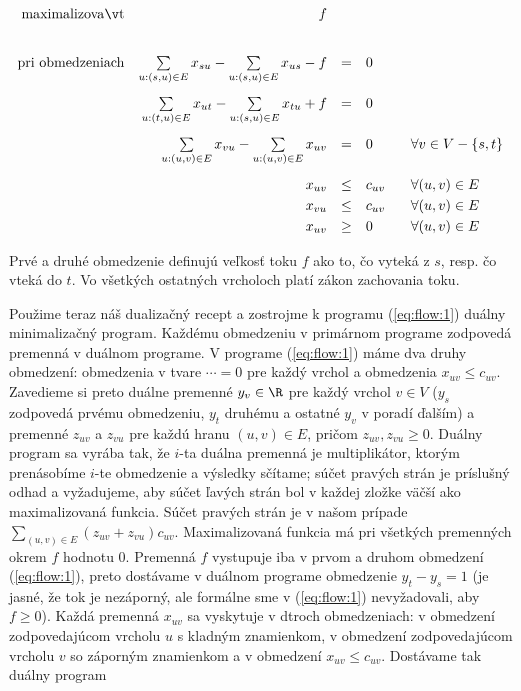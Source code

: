 \begin{equation}
  \label{eq:flow:1}
  \begin{array}{rrcll}
      {\rm maximalizovať}     & \multicolumn{1}{r}{f}\\[8mm]
    {\rm pri\ obmedzeniach} & \sum\limits_{u:(s,u)\in E} x_{su} - \sum\limits_{u:(s,u)\in E} x_{us} - f  &=&0&  \\[6mm]
                            & \sum\limits_{u:(t,u)\in E} x_{ut} - \sum\limits_{u:(s,u)\in E} x_{tu} + f  &=&0&  \\[6mm]
                            & \sum\limits_{u:(u,v)\in E} x_{vu} - \sum\limits_{u:(u,v)\in E} x_{uv} &=&0&\;\;\;
    \forall v\in V - \{s,t\}\\[6mm]
    & x_{uv}&\le& c_{uv}&  \;\;\;\forall (u,v)\in E\\[1mm]
    & x_{vu}&\le& c_{uv}&  \;\;\;\forall (u,v)\in E\\[1mm]
                            & x_{uv}&\ge& 0 &  \;\;\;\forall (u,v)\in E\\
  \end{array}
\end{equation}  

\noindent
Prvé a druhé obmedzenie definujú veľkosť toku $f$ ako to, čo vyteká z $s$, resp. čo vteká do $t$. Vo všetkých
ostatných vrcholoch platí zákon zachovania toku. 

\noindent
Použime teraz náš dualizačný recept a zostrojme k programu (\ref{eq:flow:1}) duálny minimalizačný program. 
Každému obmedzeniu v primárnom programe zodpovedá premenná v duálnom programe.
V programe (\ref{eq:flow:1}) máme dva druhy obmedzení: obmedzenia v tvare $\cdots = 0$ pre každý vrchol
a obmedzenia $x_{uv}\le c_{uv}$. Zavedieme si preto duálne premenné $y_v\in\R$ pre každý vrchol $v\in V$
($y_s$ zodpovedá prvému obmedzeniu, $y_t$ druhému a ostatné $y_v$ v poradí ďalším)
a premenné $z_{uv}$ a $z_{vu}$ pre každú hranu $(u,v)\in E$, pričom $z_{uv},z_{vu}\ge0$.
Duálny program sa vyrába tak, že $i$-ta duálna premenná je  multiplikátor, ktorým prenásobíme
$i$-te obmedzenie a výsledky sčítame; súčet pravých strán je príslušný odhad a vyžadujeme, aby
súčet ľavých strán bol v každej zložke väčší ako maximalizovaná funkcia.
Súčet pravých strán je v našom prípade $\sum\limits_{(u,v)\in E}(z_{uv}+z_{vu})c_{uv}$.
Maximalizovaná funkcia má pri všetkých premenných okrem $f$ hodnotu 0. 
Premenná $f$ vystupuje iba v prvom a druhom obmedzení (\ref{eq:flow:1}), preto dostávame
v duálnom programe obmedzenie $y_t-y_s=1$ (je jasné, že tok je nezáporný, ale formálne sme 
v (\ref{eq:flow:1}) nevyžadovali, aby $f\ge0$). Každá premenná $x_{uv}$ sa vyskytuje v 
dtroch obmedzeniach: v obmedzení zodpovedajúcom vrcholu $u$ s kladným znamienkom,  v obmedzení
zodpovedajúcom vrcholu $v$ so záporným znamienkom a v obmedzení $x_{uv}\le c_{uv}$. Dostávame
tak duálny program


